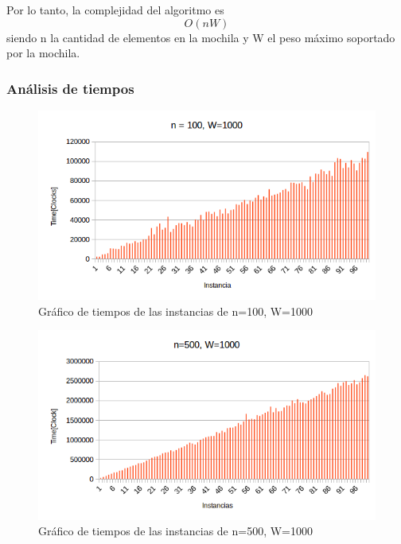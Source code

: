 Por lo tanto, la complejidad del algoritmo es
$$ O(n W) $$ siendo n la cantidad de elementos en la mochila y W el peso máximo soportado por la mochila.

\subsubsection{Análisis de tiempos}

\begin{figure}[H]
\centering
\includegraphics[width=\textwidth]{Mochila/100_1000.png}
\caption{Gráfico de tiempos de las instancias de n=100, W=1000}
\end{figure}

\begin{figure}[H]
\centering
\includegraphics[width=\textwidth]{Mochila/500_1000.png}
\caption{Gráfico de tiempos de las instancias de n=500, W=1000}
\end{figure}


